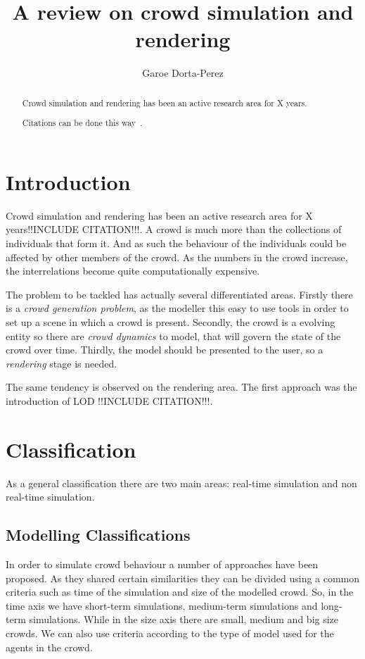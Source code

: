 \documentclass[conference]{acmsiggraph}
\title{A review on crowd simulation and rendering}
\author{Garoe Dorta-Perez}
\begin{document}
\maketitle

\begin{abstract}

Crowd simulation and rendering has been an active research area for 
X years.

Citations can be done this way~\cite{Aubel2000}.

\end{abstract}



\section{Introduction}

Crowd simulation and rendering has been an active research area for 
X years!!INCLUDE CITATION!!!. A crowd is much more than the collections of individuals
that form it. And as such the behaviour of the individuals could be
affected by other members of the crowd. As the numbers in the crowd
increase, the interrelations become quite computationally expensive.

The problem to be tackled has actually several differentiated areas. Firstly
there is a \textit{crowd generation problem}, as the modeller this easy to
use tools in order to set up a scene in which a crowd is present. Secondly,
the crowd is a evolving entity so there are \textit{crowd dynamics} to model,
that will govern the state of the crowd over time. Thirdly, the model should
be presented to the user, so a \textit{rendering} stage is needed.

The same tendency is observed on the rendering area. The first approach
was the introduction of LOD !!INCLUDE CITATION!!!. 

\section{Classification}

As a general classification there are two main areas: real-time simulation
and non real-time simulation.

\subsection{Modelling Classifications}

In order to simulate crowd behaviour a number of approaches have been
proposed. As they shared certain similarities they can be divided 
using a common criteria such as time of the simulation and size
of the modelled crowd. So, in the time
axis we have short-term simulations, medium-term simulations and
long-term simulations. While in the size axis there are small,
medium and big size crowds. We can also use criteria according to
the type of model used for the agents in the crowd.
\end{document}
